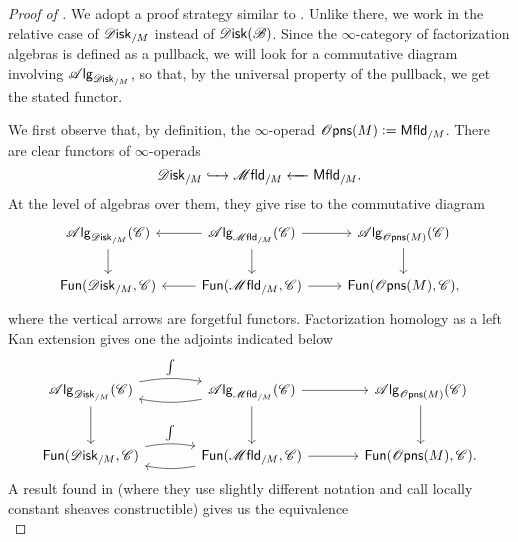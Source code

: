 \documentclass[../text.tex]{subfiles}
\begin{document}
\begin{proof}[Proof of {}]
    We adopt a proof strategy similar to \cite[prop.3.14]{af_primer}. Unlike there, we work in the relative case of $\disk_{/M}$ instead of $\disk(\bstr)$. Since the $\infty$-category of factorization algebras is defined as a pullback, we will look for a commutative diagram involving $\alg{\disk_{/M}}$, so that, by the universal property of the pullback, we get the stated functor.
    
    We first observe that, by definition, the $\infty$-operad $\opens(M) := \mfld[r]_{/M}$. There are clear functors of $\infty$-operads
    \begin{equation}
        \disk_{/M} \xhookrightarrow{\ \ \ } \mfld_{/M} \xleftarrow{\ \ \ } \mfld[r]_{/M}.
    \end{equation}
    At the level of algebras over them, they give rise to the commutative diagram
    \begin{equation}
        \begin{tikzcd}
            \alg{\disk_{/M}} (\catC) \arrow[d] & \alg{\mfld_{/M}} (\catC) \arrow[l] \arrow[r] \arrow[d] & \alg{\opens(M)} (\catC) \arrow[d] \\
            \mathsf{Fun}(\disk_{/M}, \catC) & \mathsf{Fun}(\mfld_{/M}, \catC) \arrow[l] \arrow[r] & \mathsf{Fun}(\opens(M), \catC),
        \end{tikzcd}
    \end{equation}
    where the vertical arrows are forgetful functors. Factorization homology as a left Kan extension gives one the adjoints indicated below
    \begin{equation}
        \begin{tikzcd}[row sep = large, column sep = large]
            \alg{\disk_{/M}} (\catC) \arrow[r, bend left=10, "\int"] \arrow[d] & \alg{\mfld_{/M}} (\catC) \arrow[l, bend left=10] \arrow[r] \arrow[d] & \alg{\opens(M)} (\catC) \arrow[d] \\
            \mathsf{Fun}(\disk_{/M}, \catC) \arrow[r, bend left=10, "\int"] & \mathsf{Fun}(\mfld_{/M}, \catC) \arrow[l, bend left=10] \arrow[r] & \mathsf{Fun}(\opens(M), \catC).
        \end{tikzcd}
    \end{equation}
    A result found in \cite[thm.1.2.5]{aft_localstrut} (where they use slightly different notation and call locally constant sheaves constructible) gives us the equivalence
    \begin{equation}

\end{equation}
\end{proof}
\end{document}
